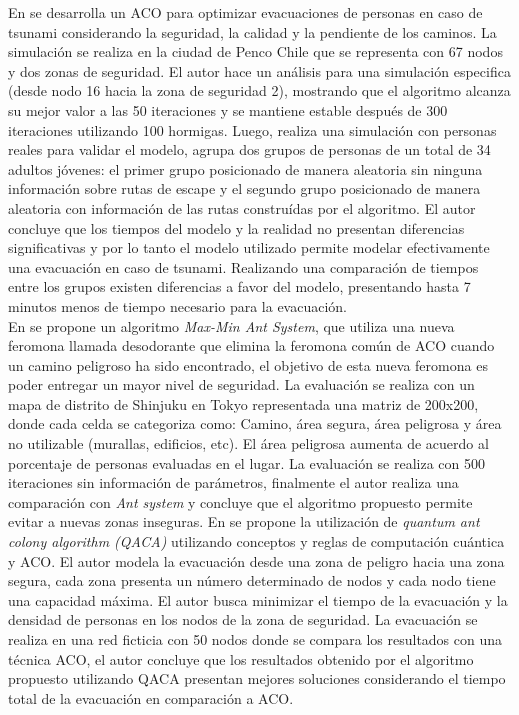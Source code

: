 En \cite{forcael2014ant} se desarrolla un ACO para optimizar evacuaciones de personas en caso de tsunami considerando la seguridad, la calidad y la pendiente de los caminos. La simulación se realiza en la ciudad de Penco Chile que se representa con 67 nodos y dos zonas de seguridad. El autor hace un análisis para una simulación especifica (desde nodo 16 hacia la zona de seguridad 2), mostrando que el algoritmo alcanza su mejor valor a las 50 iteraciones y se mantiene estable después de 300 iteraciones utilizando 100 hormigas. Luego, realiza una simulación con personas reales para validar el modelo, agrupa dos grupos de personas de un total de 34 adultos jóvenes: el primer grupo posicionado de manera aleatoria sin ninguna información sobre rutas de escape y el segundo grupo posicionado de manera aleatoria con información de las rutas construídas por el algoritmo. El autor concluye que los tiempos del modelo y la realidad no presentan diferencias significativas y por lo tanto el modelo utilizado permite modelar efectivamente una evacuación en caso de tsunami. Realizando una comparación de tiempos entre los grupos existen diferencias a favor del modelo, presentando hasta 7 minutos menos de tiempo necesario para la evacuación. \\
En \cite{ohta2016improved} se propone un algoritmo \textit{Max-Min Ant System}, que utiliza una nueva feromona llamada desodorante que elimina la feromona común de ACO cuando un camino peligroso ha sido encontrado, el objetivo de esta nueva  feromona es poder entregar un mayor nivel de seguridad. La evaluación se realiza con un mapa de distrito de Shinjuku en Tokyo representada una matriz de 200x200, donde cada celda se categoriza como: Camino, área segura, área peligrosa y área no utilizable (murallas, edificios, etc). El área peligrosa aumenta de acuerdo al porcentaje de personas evaluadas en el lugar. La evaluación se realiza con 500 iteraciones sin información de parámetros, finalmente el autor realiza una comparación con \textit{Ant system} y concluye que el algoritmo propuesto permite evitar a nuevas zonas inseguras.
En \cite{liu2016evacuation} se propone la utilización de \textit{quantum ant colony algorithm (QACA)} utilizando conceptos y reglas de computación cuántica y ACO. El autor modela la evacuación desde una zona de peligro hacia una zona segura, cada zona presenta un número determinado de nodos y cada nodo tiene una capacidad máxima. El autor busca minimizar el tiempo de la evacuación y la densidad de personas en los nodos de la zona de seguridad. La evacuación se realiza en una red ficticia con 50 nodos donde se compara los resultados con una técnica ACO, el autor concluye que los resultados obtenido por el algoritmo propuesto utilizando QACA presentan mejores soluciones considerando el tiempo total de la evacuación en comparación a ACO.\\
